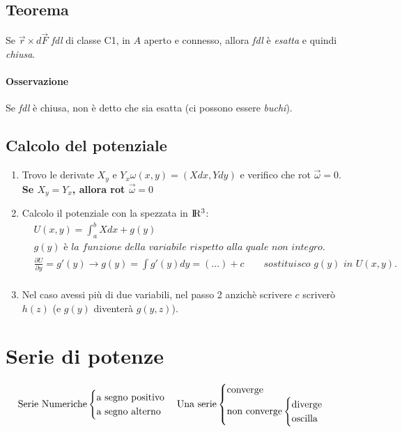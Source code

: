 \documentclass[10pt,a4paper,fleqn]{article}
\begin{document}
	\subsection{Teorema}

	Se $\vec r \times d\vec F$ \emph{fdl} di classe C1, in $A$ aperto e connesso, allora \emph{fdl} è \emph{esatta} e quindi \emph{chiusa}.
	\paragraph{Osservazione} Se \emph{fdl} è chiusa, non è detto che sia esatta (ci possono essere \emph{buchi}).

	\subsection{Calcolo del potenziale}

	\begin{enumerate}
	\item Trovo le derivate $X_y$ e $Y_x$\quad $\omega(x,y)=(Xdx, Ydy)$ e verifico che rot $\vec\omega=0$.\\\textbf{Se $X_y = Y_x$, allora rot $ \vec\omega = 0$}
	\item Calcolo il potenziale con la spezzata in $\rm I\!R^3$:
		\begin{equation}
		\begin{aligned}
		&U(x,y)=\int_a^b Xdx + g(y)\\
		&\textit{$g(y)$ è la funzione della variabile rispetto alla quale non integro.}\\
		&\frac{\partial U}{\partial y} = g'(y) \longrightarrow g(y)=\int g'(y)dy = (...)+c \qquad \textit{sostituisco $g(y)$ in $U(x,y)$.}\\
		&\text{}
		\end{aligned}
		\end{equation}
		\item Nel caso avessi più di due variabili, nel passo 2 anzichè scrivere $c$ scriverò $h(z)$ (e $g(y)$ diventerà $g(y,z)$).
	\end{enumerate}
	
	\section{Serie di potenze}
	\begin{equation}
		\text{Serie Numeriche}
			\begin{cases}
				\text{a segno positivo}\\
				\text{a segno alterno}
			\end{cases}\\
		\text{Una serie}
			\begin{cases}
				\text{converge}\\
				\text{non converge}\begin{cases}
					\text{diverge}\\
					\text{oscilla}
				\end{cases}
			\end{cases}
	\end{equation}
\end{document}
